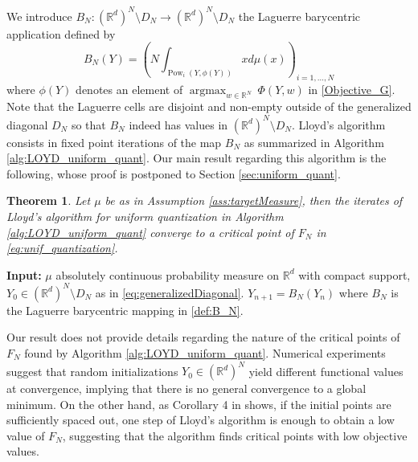 \documentclass[11pt]{article}
\DeclareMathOperator{\Pow}{Pow}
\DeclareMathOperator{\argmax}{argmax}
\newcommand{\N}{\mathbb N}
\newcommand{\R}{\mathbb R}
\newcommand{\1}{\mathbbm{1}}
\newtheorem{thm}[lem]{Theorem}
\numberwithin{equation}{section}
\begin{document}
We introduce $B_N \colon (\R^d)^N \setminus D_N \to  (\R^d)^N \setminus D_N$ the Laguerre barycentric application defined by
\begin{equation}
	\label{def:B_N}
	B_{N}(Y)=\left(N\int_{\Pow_{i}(Y,\phi(Y))}xd\mu(x)\right)_{i=1,\ldots,N}
\end{equation}
where $\phi(Y)$ denotes an element of ${\argmax}_{w\in \mathbb{R}^{N}}\:\Phi(Y,w)$ in \eqref{Objective_G}. Note that the Laguerre cells are disjoint and non-empty outside of the generalized diagonal $D_N$ so that $B_N$ indeed has values in $(\R^d)^N \setminus D_N$.
Lloyd's algorithm consists in fixed point iterations of the map $B_N$ as summarized in Algorithm \ref{alg:LOYD_uniform_quant}. 
Our main result regarding this algorithm is the following, whose proof is postponed to Section \ref{sec:uniform_quant}.

\begin{thm}\label{th:main}
	Let $\mu$ be as in Assumption \ref{ass:targetMeasure}, then the iterates of Lloyd's algorithm for uniform quantization in Algorithm \ref{alg:LOYD_uniform_quant} converge to a critical point of $F_N$ in \eqref{eq:unif_quantization}.
\end{thm}


\begin{algorithm}[t]
  \caption{Lloyd's algorithm for uniform quantization}
	\label{alg:LOYD_uniform_quant}
	\begin{algorithmic}
		\STATE \textbf{Input:} $\mu$ absolutely continuous probability measure on $\R^d$ with compact support, \\
		$Y_0  \in (\R^d)^N \setminus D_N$ as in \eqref{eq:generalizedDiagonal}.
	    \FOR{$n \in \N$}
	        \STATE $Y_{n+1} = B_N(Y_n)$ where $B_N$ is the Laguerre barycentric mapping in \eqref{def:B_N}.
	    \ENDFOR
 	\end{algorithmic}
\end{algorithm}
Our result does not provide details regarding the nature of the critical points of $F_N$ found by Algorithm \ref{alg:LOYD_uniform_quant}. Numerical experiments suggest that random initializations $Y_0\in(\R^d)^N$ yield different functional values at convergence, implying that there is no general convergence to a global minimum. On the other hand, as Corollary 4 in \cite{nonassymptotic} shows, if the initial points are sufficiently spaced out, one step of Lloyd's algorithm is enough to obtain a low value of $F_N$, suggesting that the algorithm finds critical points with low objective values.
\end{document}
